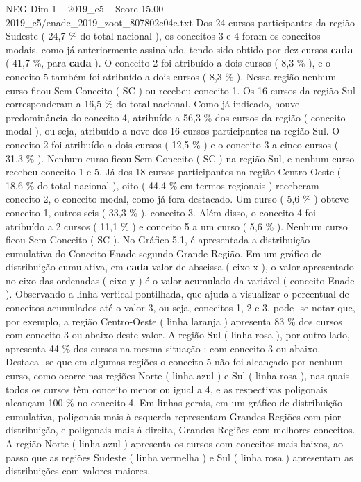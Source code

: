 \begin{textsample}{NEG Dim 1 – 2019\_c5 – Score 15.00 – 2019\_c5/enade\_2019\_zoot\_807802c04e.txt}
Dos 24 cursos participantes da região Sudeste ( 24,7 \% do total nacional ), os conceitos 3 e 4 foram os conceitos modais, como já anteriormente assinalado, tendo sido obtido por dez cursos \textbf{cada} ( 41,7 \%, para \textbf{cada} ).
O conceito 2 foi atribuído a dois cursos ( 8,3 \% ), e o conceito 5 também foi atribuído a dois cursos ( 8,3 \% ).
Nessa região nenhum curso ficou Sem Conceito ( SC ) ou recebeu conceito 1.
Os 16 cursos da região Sul corresponderam a 16,5 \% do total nacional.
Como já indicado, houve predominância do conceito 4, atribuído a 56,3 \% dos cursos da região ( conceito modal ), ou seja, atribuído a nove dos 16 cursos participantes na região Sul.
O conceito 2 foi atribuído a dois cursos ( 12,5 \% ) e o conceito 3 a cinco cursos ( 31,3 \% ).
Nenhum curso ficou Sem Conceito ( SC ) na região Sul, e nenhum curso recebeu conceito 1 e 5.
Já dos 18 cursos participantes na região Centro-Oeste ( 18,6 \% do total nacional ), oito ( 44,4 \% em termos regionais ) receberam conceito 2, o conceito modal, como já fora destacado.
Um curso ( 5,6 \% ) obteve conceito 1, outros seis ( 33,3 \% ), conceito 3.
Além disso, o conceito 4 foi atribuído a 2 cursos ( 11,1 \% ) e conceito 5 a um curso ( 5,6 \% ).
Nenhum curso ficou Sem Conceito ( SC ).
No Gráfico 5.1, é apresentada a distribuição cumulativa do Conceito Enade segundo Grande Região.
Em um gráfico de distribuição cumulativa, em \textbf{cada} valor de abscissa ( eixo x ), o valor apresentado no eixo das ordenadas ( eixo y ) é o valor acumulado da variável ( conceito Enade ).
Observando a linha vertical pontilhada, que ajuda a visualizar o percentual de conceitos acumulados até o valor 3, ou seja, conceitos 1, 2 e 3, pode -se notar que, por exemplo, a região Centro-Oeste ( linha laranja ) apresenta 83 \% dos cursos com conceito 3 ou abaixo deste valor.
A região Sul ( linha rosa ), por outro lado, apresenta 44 \% dos cursos na mesma situação : com conceito 3 ou abaixo.
Destaca -se que em algumas regiões o conceito 5 não foi alcançado por nenhum curso, como ocorre nas regiões Norte ( linha azul ) e Sul ( linha rosa ), nas quais todos os cursos têm conceito menor ou igual a 4, e as respectivas poligonais alcançam 100 \% no conceito 4.
Em linhas gerais, em um gráfico de distribuição cumulativa, poligonais mais à esquerda representam Grandes Regiões com pior distribuição, e poligonais mais à direita, Grandes Regiões com melhores conceitos.
A região Norte ( linha azul ) apresenta os cursos com conceitos mais baixos, ao passo que as regiões Sudeste ( linha vermelha ) e Sul ( linha rosa ) apresentam as distribuições com valores maiores.

\end{textsample}
